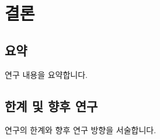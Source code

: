 \chapter{결론}\label{ch:conclusion}

\section{요약}
연구 내용을 요약합니다.

\section{한계 및 향후 연구}
연구의 한계와 향후 연구 방향을 서술합니다.

